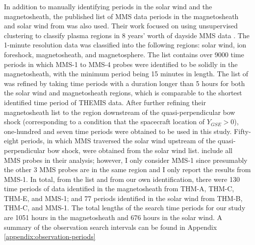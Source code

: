 In addition to manually identifying periods in the solar wind and the magnetosheath, the published list of MMS data periods in the magnetosheath and solar wind from \cite{ToyEdens:2024} was also used. Their work focused on using unsupervised clustering to classify plasma regions in 8 years' worth of dayside MMS data \citep{ToyEdens2:2024}. The 1-minute resolution data was classified into the following regions: solar wind, ion foreshock, magnetosheath, and magnetosphere. The \cite{ToyEdens:2024} list contains over 9000 time periods in which MMS-1 to MMS-4 probes were identified to be solidly in the magnetosheath, with the minimum period being 15 minutes in length. The list of \cite{ToyEdens:2024} was refined by taking time periods with a duration longer than 5 hours for both the solar wind and magnetosheath regions, which is comparable to the shortest identified time period of THEMIS data. After further refining their magnetosheath list to the region downstream of the quasi-perpendicular bow shock (corresponding to a condition that the spacecraft location of $Y_{GSE}>0$), one-hundred and seven time periods were obtained to be used in this study. Fifty-eight periods, in which MMS traversed the solar wind upstream of the quasi-perpendicular bow shock, were obtained from the \cite{ToyEdens:2024} solar wind list. \cite{ToyEdens2:2024} include all MMS probes in their analysis; however, I only consider MMS-1 since presumably the other 3 MMS probes are in the same region and I only report the results from MMS-1. In total, from the \cite{ToyEdens:2024} list and from our own identification, there were 130 time periods of data identified in the magnetosheath from THM-A, THM-C, THM-E, and MMS-1; and 77 periods identified in the solar wind from THM-B, THM-C, and MMS-1. The total lengths of the search time periods for our study are 1051 hours in the magnetosheath and 676 hours in the solar wind. A summary of the observation search intervals can be found in Appendix \ref{appendix:observation-periods}


